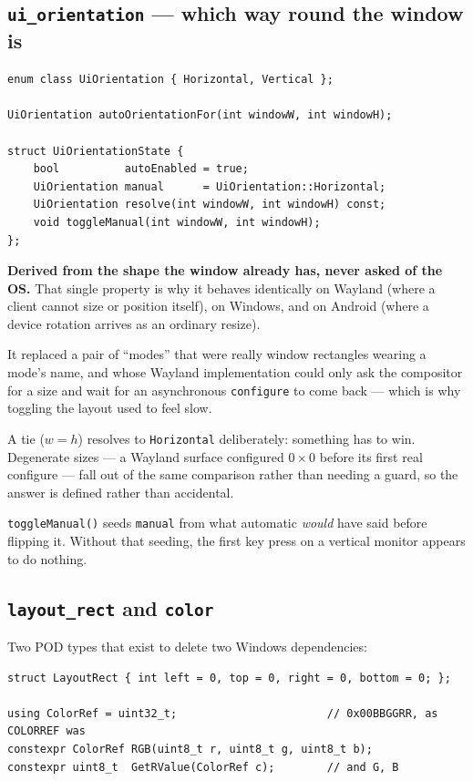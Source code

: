 \documentclass[11pt,a4paper]{article}
\begin{document}
\subsection{\texttt{ui\_orientation} --- which way round the window is}

\begin{lstlisting}
enum class UiOrientation { Horizontal, Vertical };

UiOrientation autoOrientationFor(int windowW, int windowH);

struct UiOrientationState {
    bool          autoEnabled = true;
    UiOrientation manual      = UiOrientation::Horizontal;
    UiOrientation resolve(int windowW, int windowH) const;
    void toggleManual(int windowW, int windowH);
};
\end{lstlisting}

\textbf{Derived from the shape the window already has, never asked of the OS.}
That single property is why it behaves identically on Wayland (where a client
cannot size or position itself), on Windows, and on Android (where a device
rotation arrives as an ordinary resize).

It replaced a pair of ``modes'' that were really window rectangles wearing a
mode's name, and whose Wayland implementation could only ask the compositor for
a size and wait for an asynchronous \texttt{configure} to come back --- which is
why toggling the layout used to feel slow.

A tie ($w = h$) resolves to \texttt{Horizontal} deliberately: something has to
win. Degenerate sizes --- a Wayland surface configured $0\times0$ before its
first real configure --- fall out of the same comparison rather than needing a
guard, so the answer is defined rather than accidental.

\texttt{toggleManual()} seeds \texttt{manual} from what automatic \emph{would}
have said before flipping it. Without that seeding, the first key press on a
vertical monitor appears to do nothing.

\subsection{\texttt{layout\_rect} and \texttt{color}}

Two POD types that exist to delete two Windows dependencies:

\begin{lstlisting}
struct LayoutRect { int left = 0, top = 0, right = 0, bottom = 0; };

using ColorRef = uint32_t;                       // 0x00BBGGRR, as COLORREF was
constexpr ColorRef RGB(uint8_t r, uint8_t g, uint8_t b);
constexpr uint8_t  GetRValue(ColorRef c);        // and G, B
\end{lstlisting}
\end{document}
